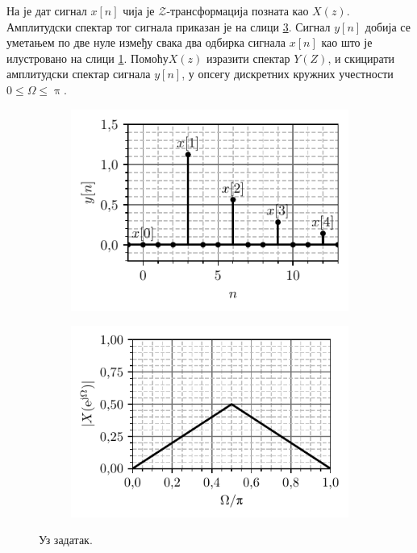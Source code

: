 \PID На је дат сигнал $x[n]$ чија је $\mathcal{Z}$-трансформација позната као $X(z)$. Амплитудски 
спектар тог сигнала приказан је на слици \ref{\ID.um.jw}. Сигнал $y[n]$ добија се уметањем по 
две нуле између свака два одбирка сигнала $x[n]$ као што је илустровано на слици \ref{\ID.um.x}.
Помоћу$X(z)$ изразити спектар $Y(Z)$, и скицирати амплитудски спектар сигнала $y[n]$, у опсегу
дискретних кружних учестности $0 \leq \Omega \leq \uppi$.

%
\begin{figure}[ht!]
    \centering
    \begin{subfigure}{0.49\textwidth}
        \includegraphics{fig/umetanje_def.pdf}
        \caption{}
        \label{\ID.um.x}    
    \end{subfigure}
    \begin{subfigure}{0.49\textwidth}
        \includegraphics{fig/umetanje_x_jw.pdf}
        \caption{}
        \label{\ID.um.jw}    
    \end{subfigure}
    \caption{Уз задатак.}
\end{figure}
